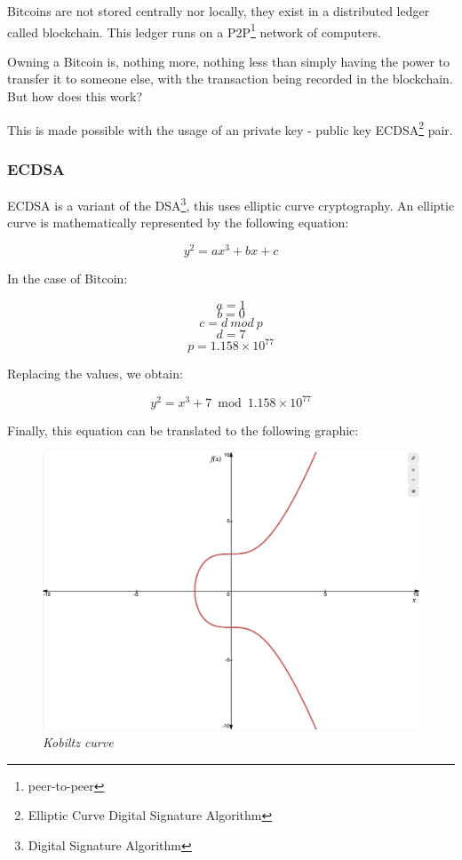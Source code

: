 \documentclass{article}
\newcommand\tab[1][1cm]{\hspace*{#1}}
\begin{document}
Bitcoins are not stored centrally nor locally, they exist in a distributed ledger called blockchain. This ledger runs on a P2P\footnote{peer-to-peer} network of computers. 

Owning a Bitcoin is, nothing more, nothing less than simply having the power to transfer it to someone else, with the transaction being recorded in the blockchain. But how does this work?

This is made possible with the usage of an private key - public key ECDSA\footnote{Elliptic Curve Digital Signature Algorithm} pair.

\subsubsection{ECDSA}

\tab ECDSA is a variant of the DSA\footnote{Digital Signature Algorithm}, this uses elliptic curve cryptography. An elliptic curve is mathematically represented by the following equation:

\[y^2 = ax^3 + bx + c\]

In the case of Bitcoin:

\[a = 1\]
\[b = 0\]
\[c = d\: mod\: p\]
\[d = 7\]
\[p = 1.158 \times 10^{77}\]

Replacing the values, we obtain:

\[y^2 = x^3 + 7 \bmod{1.158 \times 10^{77}}\]

Finally, this equation can be translated to the following graphic:


\begin{figure}[H]
    \begin{center}
        \includegraphics[width=0.5 \textwidth]{images/Kobiltz_curve.png}
        \caption{\textit{Kobiltz curve}}
    \end{center}
\end{figure}
\end{document}
